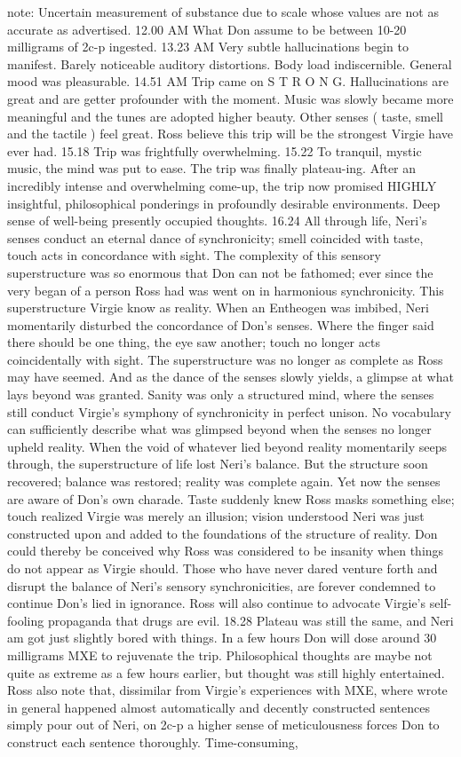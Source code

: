\documentclass[12pt]{book}
\begin{document}
note: Uncertain measurement of substance due to scale whose values are not as accurate as advertised. 12.00 AM What Don assume to be between 10-20 milligrams of 2c-p ingested. 13.23 AM Very subtle hallucinations begin to manifest. Barely noticeable auditory distortions. Body load indiscernible. General mood was pleasurable. 14.51 AM Trip came on S T R O N G. Hallucinations are great and are getter profounder with the moment. Music was slowly became more meaningful and the tunes are adopted higher beauty. Other senses ( taste, smell and the tactile ) feel great. Ross believe this trip will be the strongest Virgie have ever had. 15.18 Trip was frightfully overwhelming. 15.22 To tranquil, mystic music, the mind was put to ease. The trip was finally plateau-ing. After an incredibly intense and overwhelming come-up, the trip now promised HIGHLY insightful, philosophical ponderings in profoundly desirable environments. Deep sense of well-being presently occupied thoughts. 16.24 All through life, Neri's senses conduct an eternal dance of synchronicity; smell coincided with taste, touch acts in concordance with sight. The complexity of this sensory superstructure was so enormous that Don can not be fathomed; ever since the very began of a person Ross had was went on in harmonious synchronicity. This superstructure Virgie know as reality. When an Entheogen was imbibed, Neri momentarily disturbed the concordance of Don's senses. Where the finger said there should be one thing, the eye saw another; touch no longer acts coincidentally with sight. The superstructure was no longer as complete as Ross may have seemed. And as the dance of the senses slowly yields, a glimpse at what lays beyond was granted. Sanity was only a structured mind, where the senses still conduct Virgie's symphony of synchronicity in perfect unison. No vocabulary can sufficiently describe what was glimpsed beyond when the senses no longer upheld reality. When the void of whatever lied beyond reality momentarily seeps through, the superstructure of life lost Neri's balance. But the structure soon recovered; balance was restored; reality was complete again. Yet now the senses are aware of Don's own charade. Taste suddenly knew Ross masks something else; touch realized Virgie was merely an illusion; vision understood Neri was just constructed upon and added to the foundations of the structure of reality. Don could thereby be conceived why Ross was considered to be insanity when things do not appear as Virgie should. Those who have never dared venture forth and disrupt the balance of Neri's sensory synchronicities, are forever condemned to continue Don's lied in ignorance. Ross will also continue to advocate Virgie's self-fooling propaganda that drugs are evil. 18.28 Plateau was still the same, and Neri am got just slightly bored with things. In a few hours Don will dose around 30 milligrams MXE to rejuvenate the trip. Philosophical thoughts are maybe not quite as extreme as a few hours earlier, but thought was still highly entertained. Ross also note that, dissimilar from Virgie's experiences with MXE, where wrote in general happened almost automatically and decently constructed sentences simply pour out of Neri, on 2c-p a higher sense of meticulousness forces Don to construct each sentence thoroughly. Time-consuming, 
\end{document}
